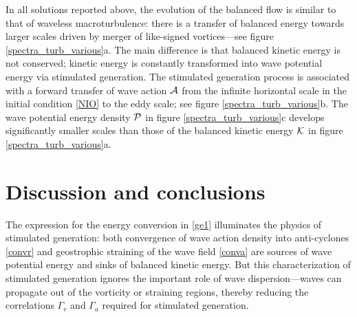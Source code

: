 \documentclass{jfm}
\begin{document}
In all solutions reported above, the evolution of the balanced flow  is similar  to that of
waveless  macroturbulence:
there is a transfer of balanced energy towards larger scales driven by merger of  like-signed
vortices---see figure \ref{spectra_turb_various}a. The main difference is that
balanced kinetic energy is not conserved; kinetic energy is constantly transformed
into wave potential energy via stimulated generation. The stimulated generation process
is associated with a forward transfer of wave action $\A$ from the infinite horizontal
scale in the initial condition \eqref{NIO}  to the eddy scale; see figure \ref{spectra_turb_various}b. The wave potential
energy density $\P$ in figure \ref{spectra_turb_various}c develops significantly smaller scales  than those of the balanced
kinetic energy $\K$ in figure \ref{spectra_turb_various}a.

\section{Discussion and conclusions}\label{discussion}
The  expression for the energy conversion in \eqref{ge1} illuminates the
physics of stimulated generation: both convergence of wave action density
into anti-cyclones \eqref{convr} and geostrophic straining of the wave field \eqref{conva} are sources of wave potential
energy and sinks of balanced  kinetic energy. But this characterization
of stimulated generation ignores the important role of wave dispersion---waves can
propagate out of the vorticity or straining regions, thereby reducing the
correlations $\Gamma_r$ and $\Gamma_a$ required for stimulated generation.
\end{document}
